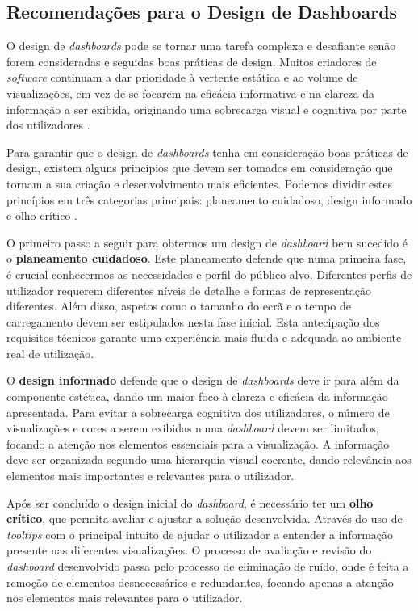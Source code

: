 \subsection{Recomendações para o Design de Dashboards} %
\label{sub:recomendacoes_design}

O design de \textit{dashboards} pode se tornar uma tarefa complexa e desafiante senão forem consideradas e seguidas boas práticas de design. Muitos criadores de \textit{software} continuam a dar prioridade à vertente estática e ao volume de visualizações, em vez de se focarem na eficácia informativa e na clareza da informação a ser exibida, originando uma sobrecarga visual e cognitiva por parte dos utilizadores \cite{abduldaem2019principles}.

Para garantir que o design de \textit{dashboards} tenha em consideração boas práticas de design, existem alguns princípios que devem ser tomados em consideração que tornam a sua criação e desenvolvimento mais eficientes. Podemos dividir estes princípios em três categorias principais: planeamento cuidadoso, design informado e olho crítico \cite{Tableau2020}.

O primeiro passo a seguir para obtermos um design de \textit{dashboard} bem sucedido é o \textbf{planeamento cuidadoso}. Este planeamento defende que numa primeira fase, é crucial conhecermos as necessidades e perfil do público-alvo. Diferentes perfis de utilizador requerem diferentes níveis de detalhe e formas de representação diferentes. Além disso, aspetos como o tamanho do ecrã e o tempo de carregamento devem ser estipulados nesta fase inicial. Esta antecipação dos requisitos técnicos garante uma experiência mais fluida e adequada ao ambiente real de utilização.

O \textbf{design informado} defende que o design de \textit{dashboards} deve ir para além da componente estética, dando um maior foco à clareza e eficácia da informação apresentada. Para evitar a sobrecarga cognitiva dos utilizadores, o número de visualizações e cores a serem exibidas numa \textit{dashboard} devem ser limitados, focando a atenção nos elementos essenciais para a visualização. A informação deve ser organizada segundo uma hierarquia visual coerente, dando relevância aos elementos mais importantes e relevantes para o utilizador.  

Após ser concluído o design inicial do \textit{dashboard}, é necessário ter um \textbf{olho crítico}, que permita avaliar e ajustar a solução desenvolvida. Através do uso de \textit{tooltips} com o principal intuito de ajudar o utilizador a entender a informação presente nas diferentes visualizações. O processo de avaliação e revisão do \textit{dashboard} desenvolvido passa pelo processo de eliminação de ruído, onde é feita a remoção de elementos desnecessários e redundantes, focando apenas a atenção nos elementos mais relevantes para o utilizador. 

